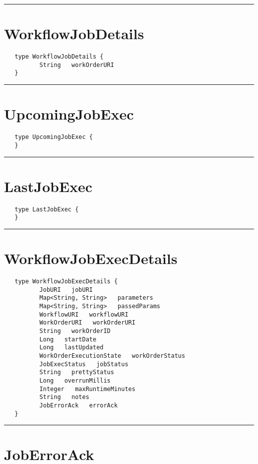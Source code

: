\rule{15cm}{2pt}
\section{WorkflowJobDetails}
\label{type:WorkflowJobDetails}

\begin{verbatim}
   type WorkflowJobDetails {
          String   workOrderURI
   }
\end{verbatim}

\rule{15cm}{2pt}
\section{UpcomingJobExec}
\label{type:UpcomingJobExec}

\begin{verbatim}
   type UpcomingJobExec {
   }
\end{verbatim}

\rule{15cm}{2pt}
\section{LastJobExec}
\label{type:LastJobExec}

\begin{verbatim}
   type LastJobExec {
   }
\end{verbatim}

\rule{15cm}{2pt}
\section{WorkflowJobExecDetails}
\label{type:WorkflowJobExecDetails}

\begin{verbatim}
   type WorkflowJobExecDetails {
          JobURI   jobURI
          Map<String, String>   parameters
          Map<String, String>   passedParams
          WorkflowURI   workflowURI
          WorkOrderURI   workOrderURI
          String   workOrderID
          Long   startDate
          Long   lastUpdated
          WorkOrderExecutionState   workOrderStatus
          JobExecStatus   jobStatus
          String   prettyStatus
          Long   overrunMillis
          Integer   maxRuntimeMinutes
          String   notes
          JobErrorAck   errorAck
   }
\end{verbatim}

\rule{15cm}{2pt}
\section{JobErrorAck}
\label{type:JobErrorAck}

